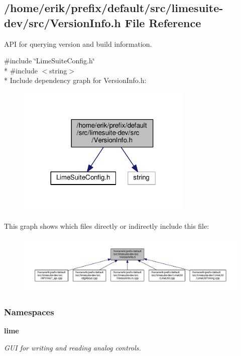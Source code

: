\subsection{/home/erik/prefix/default/src/limesuite-\/dev/src/\+Version\+Info.h File Reference}
\label{VersionInfo_8h}


A\+PI for querying version and build information.  


{\ttfamily \#include \char`\"{}Lime\+Suite\+Config.\+h\char`\"{}}\\*
{\ttfamily \#include $<$string$>$}\\*
Include dependency graph for Version\+Info.\+h\+:
\nopagebreak
\begin{figure}[H]
\begin{center}
\leavevmode
\includegraphics[width=236pt]{dc/dee/VersionInfo_8h__incl}
\end{center}
\end{figure}
This graph shows which files directly or indirectly include this file\+:
\nopagebreak
\begin{figure}[H]
\begin{center}
\leavevmode
\includegraphics[width=350pt]{d1/deb/VersionInfo_8h__dep__incl}
\end{center}
\end{figure}
\subsubsection*{Namespaces}
\begin{DoxyCompactItemize}
\item 
 {\bf lime}
\begin{DoxyCompactList}\small\item\em G\+UI for writing and reading analog controls. \end{DoxyCompactList}\end{DoxyCompactItemize}
